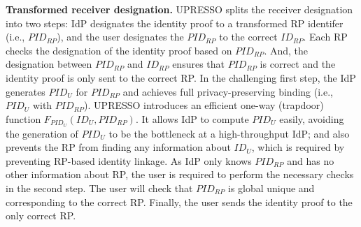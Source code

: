 \vspace{1mm}\noindent \textbf{Transformed receiver designation.}
UPRESSO splits the receiver designation into two steps: IdP designates the identity proof to a transformed RP identifer (i.e., $PID_{RP}$), and the user designates the $PID_{RP}$ to the correct $ID_{RP}$.
 Each RP checks the  designation of the identity proof based on $PID_{RP}$.
And, the designation between $PID_{RP}$ and $ID_{RP}$ ensures that $PID_{RP}$ is correct and the identity proof is only sent to the correct RP.
In the challenging first step, the IdP generates $PID_U$ for $PID_{RP}$ and achieves full privacy-preserving binding (i.e., $PID_U$ with $PID_{RP}$).
UPRESSO introduces an efficient one-way (trapdoor) function $F_{PID_{U}}(ID_U, PID_{RP})$.
 It allows IdP to  compute $PID_U$ easily,  avoiding the generation of $PID_U$ to be the bottleneck at a high-throughput IdP;
   and also prevents the RP from finding any information about $ID_U$, which is required by preventing RP-based identity linkage.
As IdP only knows $PID_{RP}$ and has no other information about RP, the user is required to perform the necessary checks  in the second step.
The user will check that $PID_{RP}$ is global unique and corresponding to the correct RP.
Finally, the user sends the identity proof  to the only correct RP.



